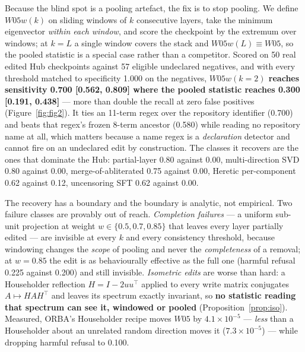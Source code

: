 \documentclass[11pt,letterpaper]{article}
\begin{document}
Because the blind spot is a pooling artefact, the fix is to stop pooling. We define $W05w(k)$ on sliding windows of $k$ consecutive layers, take the minimum eigenvector \emph{within each window}, and score the checkpoint by the extremum over windows; at $k = L$ a single window covers the stack and $W05w(L) \equiv W05$, so the pooled statistic is a special case rather than a competitor. Scored on 50 real edited Hub checkpoints against 57 eligible undeclared negatives, and with every threshold matched to specificity 1.000 on the negatives, \textbf{$W05w(k{=}2)$ reaches sensitivity 0.700 [0.562, 0.809] where the pooled statistic reaches 0.300 [0.191, 0.438]} --- more than double the recall at zero false positives (Figure~\ref{fig:fig2}). It ties an 11-term regex over the repository identifier (0.700) and beats that regex's frozen 8-term ancestor (0.580) while reading no repository name at all, which matters because a name regex is a \emph{declaration} detector and cannot fire on an undeclared edit by construction. The classes it recovers are the ones that dominate the Hub: partial-layer 0.80 against 0.00, multi-direction SVD 0.80 against 0.00, merge-of-abliterated 0.75 against 0.00, Heretic per-component 0.62 against 0.12, uncensoring SFT 0.62 against 0.00.

The recovery has a boundary and the boundary is analytic, not empirical. Two failure classes are provably out of reach. \emph{Completion failures} --- a uniform sub-unit projection at weight $w \in \{0.5, 0.7, 0.85\}$ that leaves every layer partially edited --- are invisible at every $k$ and every consistency threshold, because windowing changes the \emph{scope} of pooling and never the \emph{completeness} of a removal; at $w = 0.85$ the edit is as behaviourally effective as the full one (harmful refusal 0.225 against 0.200) and still invisible. \emph{Isometric edits} are worse than hard: a Householder reflection $H = I - 2uu^\top$ applied to every write matrix conjugates $A \mapsto HAH^\top$ and leaves its spectrum exactly invariant, so \textbf{no statistic reading that spectrum can see it, windowed or pooled} (Proposition~\ref{prop:iso}). Measured, ORBA's Householder recipe moves $W05$ by $4.1\times10^{-5}$ --- \emph{less} than a Householder about an unrelated random direction moves it ($7.3\times10^{-5}$) --- while dropping harmful refusal to 0.100.
\end{document}

